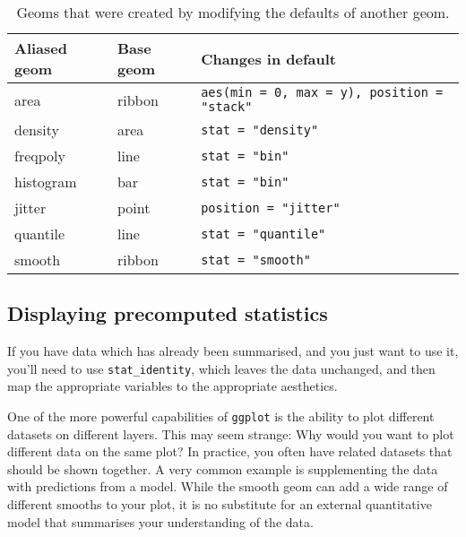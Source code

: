\begin{table}
  \begin{center}
  \begin{tabular}{lll}
    \toprule
    Aliased geom & Base geom & Changes in default \\
    \midrule
    area      & ribbon & \verb!aes(min = 0, max = y), position = "stack"!  \\
    density   & area   & \verb!stat = "density"!    \\
    freqpoly  & line   & \verb!stat = "bin"!        \\
    histogram & bar    & \verb!stat = "bin"!        \\
    jitter    & point  & \verb!position = "jitter"! \\
    quantile  & line   & \verb!stat = "quantile"!   \\
    smooth    & ribbon & \verb!stat = "smooth"!     \\
    \bottomrule
  \end{tabular}
  \end{center}
  \caption{Geoms that were created by modifying the defaults of another geom.}
  \label{tbl:aliased-geoms}
\end{table}

\subsection{Displaying precomputed statistics}\label{sub:precomputed}

If you have data which has already been summarised, and you just want to
use it, you'll need to use \texttt{stat\_identity}, which leaves the
data unchanged, and then map the appropriate variables to the
appropriate aesthetics.  


One of the more powerful capabilities of \texttt{ggplot} is the ability
to plot different datasets on different layers. This may seem strange:
Why would you want to plot different data on the same plot? In practice,
you often have related datasets that should be shown together. A very
common example is supplementing the data with predictions from a model.
While the smooth geom can add a wide range of different smooths to your
plot, it is no substitute for an external quantitative model that
summarises your understanding of the data.

